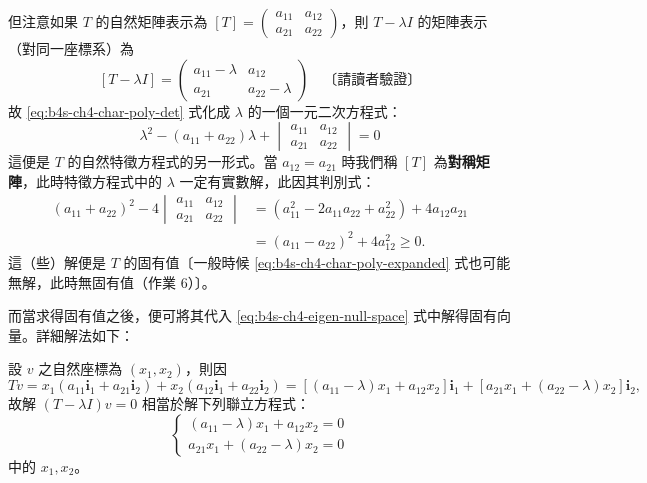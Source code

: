 但注意如果 $T$ 的自然矩陣表示為 $[T] = \begin{pmatrix} a_{11} & a_{12} \\ a_{21} & a_{22} \end{pmatrix}$，則 $T - \lambda I$ 的矩陣表示（對同一座標系）為
\[
[T - \lambda I] = \begin{pmatrix} a_{11} - \lambda & a_{12} \\ a_{21} & a_{22} - \lambda \end{pmatrix} \quad \text{〔請讀者驗證〕}
\]
故 \eqref{eq:b4s-ch4-char-poly-det} 式化成 $\lambda$ 的一個一元二次方程式：
\begin{equation}
\lambda^2 - (a_{11} + a_{22})\lambda + \begin{vmatrix} a_{11} & a_{12} \\ a_{21} & a_{22} \end{vmatrix} = 0
\label{eq:b4s-ch4-char-poly-expanded}
\end{equation}
這便是 $T$ 的自然特徵方程式的另一形式。當 $a_{12} = a_{21}$ 時我們稱 $[T]$ 為\textbf{對稱矩陣}，此時特徵方程式中的 $\lambda$ 一定有實數解，此因其判別式：
\[
\begin{aligned}
(a_{11} + a_{22})^2 - 4\begin{vmatrix} a_{11} & a_{12} \\ a_{21} & a_{22} \end{vmatrix}
&= (a_{11}^2 - 2a_{11} a_{22} + a_{22}^2) + 4a_{12} a_{21} \\
&= (a_{11} - a_{22})^2 + 4a_{12}^2 \ge 0.
\end{aligned}
\]
這（些）解便是 $T$ 的固有值〔一般時候 \eqref{eq:b4s-ch4-char-poly-expanded} 式也可能無解，此時無固有值（作業 6）〕。

而當求得固有值之後，便可將其代入 \eqref{eq:b4s-ch4-eigen-null-space} 式中解得固有向量。詳細解法如下：

設 $v$ 之自然座標為 $(x_1, x_2)$，則因
\[
Tv = x_1 (a_{11} \mathbf{i}_1 + a_{21} \mathbf{i}_2) + x_2 (a_{12} \mathbf{i}_1 + a_{22} \mathbf{i}_2) = [(a_{11} - \lambda)x_1 + a_{12} x_2]\mathbf{i}_1 + [a_{21} x_1 + (a_{22} - \lambda)x_2]\mathbf{i}_2,
\]
故解 $(T - \lambda I)v = 0$ 相當於解下列聯立方程式：
\begin{equation}
\begin{cases}
(a_{11} - \lambda)x_1 + a_{12} x_2 = 0 \\
a_{21} x_1 + (a_{22} - \lambda)x_2 = 0
\end{cases}
\label{eq:b4s-ch4-eigen-system}
\end{equation}
中的 $x_1, x_2$。

